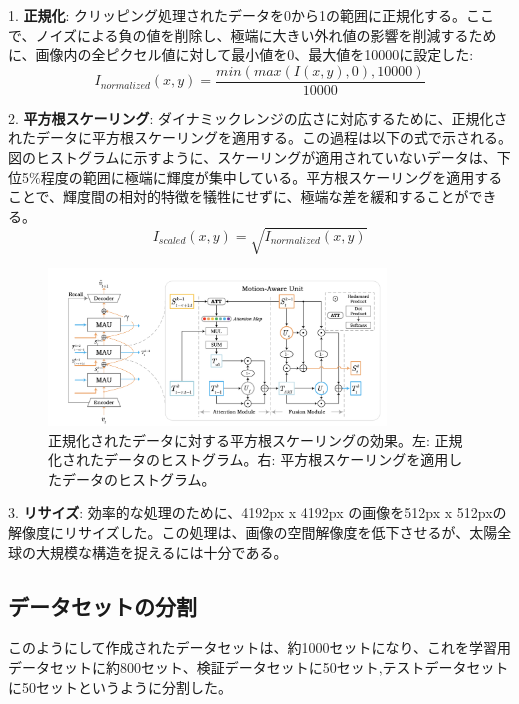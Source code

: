 1. \textbf{正規化}: クリッピング処理されたデータを0から1の範囲に正規化する。ここで、ノイズによる負の値を削除し、極端に大きい外れ値の影響を削減するために、画像内の全ピクセル値に対して最小値を0、最大値を10000に設定した:
   \begin{equation}
   I_{normalized}(x, y) = \frac{min(max(I(x,y), 0), 10000)}{10000}
   \end{equation}

2. \textbf{平方根スケーリング}: ダイナミックレンジの広さに対応するために、正規化されたデータに平方根スケーリングを適用する。この過程は以下の式で示される。図のヒストグラムに示すように、スケーリングが適用されていないデータは、下位5\%程度の範囲に極端に輝度が集中している。平方根スケーリングを適用することで、輝度間の相対的特徴を犠牲にせずに、極端な差を緩和することができる。
   \begin{equation}
   I_{scaled}(x, y) = \sqrt{I_{normalized}(x, y)}
   \end{equation}

\begin{figure}[h]
    \centering
    \includegraphics[width=0.8\textwidth]{figures/mau.png}
    \caption{正規化されたデータに対する平方根スケーリングの効果。左: 正規化されたデータのヒストグラム。右: 平方根スケーリングを適用したデータのヒストグラム。}
    \label{fig:scale_histogram}
\end{figure}

3. \textbf{リサイズ}: 効率的な処理のために、4192px x 4192px の画像を512px x 512pxの解像度にリサイズした。この処理は、画像の空間解像度を低下させるが、太陽全球の大規模な構造を捉えるには十分である。



\subsection{データセットの分割}

このようにして作成されたデータセットは、約1000セットになり、これを学習用データセットに約800セット、検証データセットに50セット,テストデータセットに50セットというように分割した。

